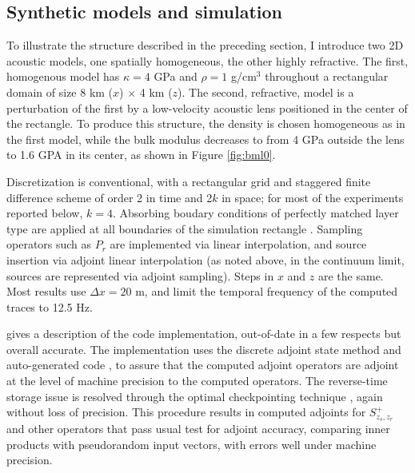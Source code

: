 \subsection{Synthetic models and simulation}
To illustrate the structure described in the preceding section, I
introduce two 2D acoustic models, one spatially homogeneous, the other
highly refractive. The first, homogenous model has $\kappa = 4$
GPa and $\rho = 1$ g/cm$^3$ throughout a rectangular domain of size 8 km ($x$) $\times$ 4 km
($z$). The second, refractive, model is a perturbation of the first by
a low-velocity acoustic lens positioned in the center of the
rectangle. To produce this structure, the density is chosen
homogeneous as in the first model, while the bulk modulus decreases to
from 4 GPa outside the lens to 1.6 GPA in its center, as shown in Figure \ref{fig:bml0}.

Discretization is conventional, with a rectangular grid and staggered
finite difference scheme \cite[]{Vir:84} of order 2 in time and
2$k$ in space; for most of the experiments reported below,
$k=4$. Absorbing boudary conditions of perfectly matched layer type
are applied at all boundaries of the simulation rectangle \cite[]{Habashy:07}.
Sampling operators such as $P_r$ are implemented via linear
interpolation, and source insertion via adjoint linear interpolation
(as noted above, in the continuum limit, sources are represented via
adjoint sampling). Steps in $x$ and $z$ are the same. Most results use
$\Delta x = 20$ m, and limit the temporal frequency of the computed
traces to 12.5 Hz.

\cite{GeoPros:11} gives a description of the code
implementation, out-of-date in a few respects but overall accurate.
The implementation uses the discrete adjoint state method and
auto-generated code \cite[]{TapenadeRef13}, to assure that the
computed adjoint operators are adjoint at the level of machine
precision to the computed operators. The reverse-time storage issue is
resolved through the optimal checkpointing technique
\cite[]{Griewank:book,Symes:06a-pub}, again without loss of
precision. This procedure results in computed adjoints for
$S^+_{z_s,z_r}$ and other operators that pass usual test for adjoint
accuracy, comparing inner products with pseudorandom input vectors,
with errors well under machine precision.

